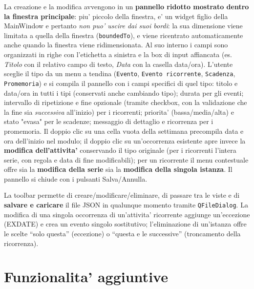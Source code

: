 \documentclass[10pt,a4paper]{article}
\begin{document}
La creazione e la modifica avvengono in un \textbf{pannello ridotto mostrato
dentro la finestra principale}: piu' piccolo della finestra, e' un widget
figlio della MainWindow e pertanto \emph{non puo' uscire dai suoi bordi}: la
sua dimensione viene limitata a quella della finestra (\texttt{boundedTo}), e
viene ricentrato automaticamente anche quando la finestra viene ridimensionata.
Al suo interno i campi sono organizzati in righe con l'etichetta a sinistra e la
box di input affiancata (es. \emph{Titolo} con il relativo campo di testo,
\emph{Data} con la casella data/ora). L'utente sceglie il tipo da un menu a
tendina (\texttt{Evento}, \texttt{Evento ricorrente}, \texttt{Scadenza},
\texttt{Promemoria}) e si compila il pannello con i campi specifici di quel
tipo: titolo e data/ora in tutti i tipi (conservati anche cambiando tipo);
durata per gli eventi; intervallo di ripetizione e fine opzionale (tramite
checkbox, con la validazione che la fine sia \emph{successiva} all'inizio)
per i ricorrenti; priorita' (bassa/media/alta) e stato "evasa" per le
scadenze; messaggio di dettaglio e ricorrenza per i promemoria. Il doppio clic
su una cella vuota della settimana precompila data e ora dell'inizio nel modulo;
il doppio clic su un'occorrenza esistente apre invece la \textbf{modifica
dell'attivita'} conservando il tipo originale (per i ricorrenti l'intera serie,
con regola e data di fine modificabili); per un ricorrente il menu contestuale
offre sia la \textbf{modifica della serie} sia la \textbf{modifica della singola
istanza}. Il pannello si chiude con i pulsanti
Salva/Annulla.

La toolbar permette di creare/modificare/eliminare, di passare tra le viste e
di \textbf{salvare e caricare} il file JSON in qualunque momento tramite
\texttt{QFileDialog}. La modifica di una singola occorrenza di un'attivita'
ricorrente aggiunge un'eccezione (EXDATE) e crea un evento singolo sostitutivo;
l'eliminazione di un'istanza offre le scelte ``solo questa'' (eccezione) o
``questa e le successive'' (troncamento della ricorrenza).

\section{Funzionalita' aggiuntive}
\end{document}
